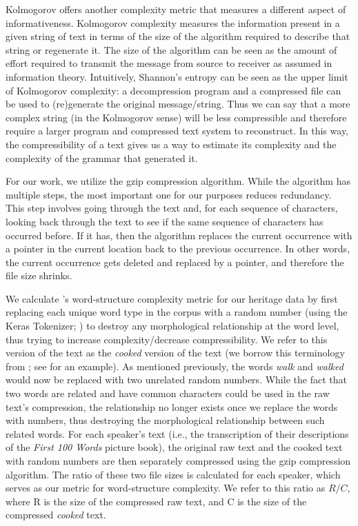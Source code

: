 \documentclass[output=paper]{langscibook}
\begin{document}
Kolmogorov offers another complexity metric that measures a different aspect of informativeness. Kolmogorov complexity measures the information present in a given string of text 
in terms of the size of the algorithm required to describe that string or regenerate it. The size of the algorithm can be seen as the amount of effort required to transmit the message from source to receiver as assumed in information theory. Intuitively, Shannon’s entropy can be seen as the upper limit of Kolmogorov complexity: a decompression program and a compressed file can be used to (re)generate the original message/string. Thus we can say that a more complex string (in the Kolmogorov sense) will be less compressible and therefore require a larger program and compressed text system to reconstruct. In this way, the compressibility of a text gives us a way to estimate its complexity and the complexity of the grammar that generated it. 

For our work, we utilize the gzip compression algorithm. 
While the algorithm has multiple steps, the most important one for our purposes reduces redundancy. 
This step involves going through the text and, for each sequence of characters, looking back through the text to see if the same sequence of characters has occurred before. If it has, then the algorithm replaces the current occurrence with a pointer in the current location back to the previous occurrence. In other words, the current occurrence gets deleted and replaced by a pointer, and therefore the file size shrinks. 

We calculate \citeauthor{juola1998measuring}'s word-structure complexity metric for our heritage data by first replacing each unique word type in the corpus with a random number (using the Keras Tokenizer; \citealp{chollet2015keras}) to destroy any morphological relationship at the word level, thus trying to increase complexity/decrease compressibility. We refer to this version of the text as the \textit{cooked} version of the text (we borrow this terminology from \citealp{juola1998measuring}; see  for an example). As mentioned previously, the words \emph{walk} and \emph{walked} would now be replaced with two unrelated random numbers. While the fact that two words are related and have common characters could be used in the raw text's compression, the relationship no longer exists once we replace the words with numbers, thus destroying the morphological relationship between such related words. For each speaker's text (i.e., the transcription of their descriptions of the \emph{First 100 Words} picture book), the original raw text and the cooked text with random numbers are then separately compressed using the gzip compression algorithm. The ratio of these two file sizes is calculated for each speaker, which serves as our metric for word-structure complexity. We refer to this ratio as $R/C$, where R is the size of the compressed raw text, and C is the size of the compressed \textit{cooked} text. 
\end{document}
